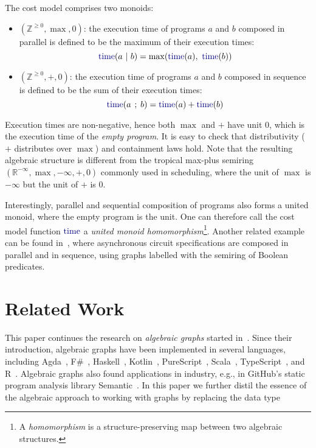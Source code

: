 \documentclass[crc,english]{programming}
\newcommand{\code}[1]{\lstinline[mathescape]|#1|}
\newcommand{\hcode}[1]{{\color{darkblue} \lstinline[keywordstyle={}]|#1|}} %
\begin{document}
\newpage
\noindent
The cost model comprises two monoids:

\begin{itemize}
    \item $(\mathbb{Z}^{\ge 0}, \max, 0)$: the execution time of programs $a$
    and $b$ composed in parallel is defined to be the maximum of their execution
    times:
    \[
    \text{\hcode{time}}(a\ \text{\code{|}}\ b) = \max(\text{\hcode{time}}(a),\ \text{\hcode{time}}(b))
    \]

    \item $(\mathbb{Z}^{\ge 0}, +, 0)$: the execution time of programs $a$ and
    $b$ composed in sequence is defined to be the sum of their execution times:
    \[
    \text{\hcode{time}}(a\ \text{\code{;}}\ b) = \text{\hcode{time}}(a) + \text{\hcode{time}}(b)
    \]
\end{itemize}

\noindent
Execution times are non-negative, hence both $\max$ and $+$ have unit $0$,
which is the execution time of the \emph{empty program}. It is easy to check
that distributivity ($+$ distributes over $\max$) and containment laws hold.
Note that the resulting algebraic structure is different from the tropical
max-plus semiring $(\mathbb{R}^{-\infty}, \max, -\infty, +, 0)$ commonly used in
scheduling, where the unit of $\max$ is $-\infty$ but the unit of $+$ is $0$.

Interestingly, parallel and sequential composition of programs also forms a
united monoid, where the empty program is the unit. One can therefore call the
cost model function $\text{\hcode{time}}$ a \emph{united monoid
homomorphism}\footnote{
    A \emph{homomorphism} is a structure-preserving map between two algebraic
    structures.
}. Another related example can be found in~\cite{beaumont2017concepts}, where
asynchronous circuit specifications are composed in parallel and in sequence,
using graphs labelled with the semiring of Boolean predicates.


\section{Related Work}\label{sec-related-work}

This paper continues the research on \emph{algebraic graphs} started
in~\cite{mokhov_alga}. Since their introduction, algebraic graphs have been
implemented in several languages, including Agda~\cite{alga_agda},
F\#~\cite{alga_fsharp}, Haskell~\cite{alga_haskell},
Kotlin~\cite{alga_kotlin}, PureScript~\cite{alga_purescript},
Scala~\cite{alga_scala}, TypeScript~\cite{alga_typescript}, and
R~\cite{alga_r}. Algebraic graphs also found applications in industry, e.g., in
GitHub's static program analysis library
Semantic~\cite{semantic_paper}\cite{semantic_repo}. In this paper we further
distil the essence of the algebraic approach to working with graphs by replacing
the data type
\end{document}
